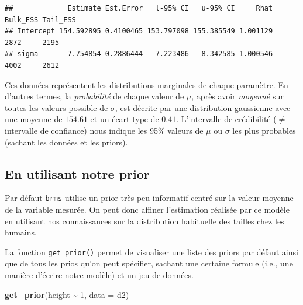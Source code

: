 \documentclass[
  a4paper,11pt,twoside,onecolumn,openright,final,oldfontcommands]{memoir}
\newenvironment{Shaded}{\begin{snugshade}}{\end{snugshade}}
\newcommand{\DataTypeTok}[1]{\textcolor[rgb]{0.13,0.29,0.53}{#1}}
\newcommand{\DecValTok}[1]{\textcolor[rgb]{0.00,0.00,0.81}{#1}}
\newcommand{\KeywordTok}[1]{\textcolor[rgb]{0.13,0.29,0.53}{\textbf{#1}}}
\newcommand{\NormalTok}[1]{#1}
\newcommand{\OperatorTok}[1]{\textcolor[rgb]{0.81,0.36,0.00}{\textbf{#1}}}
\newcommand{\StringTok}[1]{\textcolor[rgb]{0.31,0.60,0.02}{#1}}
\theoremstyle{definition}
\theoremstyle{definition}
\theoremstyle{definition}
\theoremstyle{remark}
\begin{document}
\begin{Shaded}
\end{Shaded}

\begin{verbatim}
##             Estimate Est.Error   l-95% CI   u-95% CI     Rhat Bulk_ESS Tail_ESS
## Intercept 154.592895 0.4100465 153.797098 155.385549 1.001129     2872     2195
## sigma       7.754854 0.2886444   7.223486   8.342585 1.000546     4002     2612
\end{verbatim}

Ces données représentent les distributions marginales de chaque paramètre. En d'autres termes, la \emph{probabilité} de chaque valeur de \(\mu\), après avoir \emph{moyenné} sur toutes les valeurs possible de \(\sigma\), est décrite par une distribution gaussienne avec une moyenne de \(154.61\) et un écart type de \(0.41\). L'intervalle de crédibilité (\(\neq\) intervalle de confiance) nous indique les 95\% valeurs de \(\mu\) ou \(\sigma\) les plus probables (sachant les données et les priors).

\hypertarget{en-utilisant-notre-prior}{%
\subsection{En utilisant notre prior}\label{en-utilisant-notre-prior}}

Par défaut \texttt{brms} utilise un prior très peu informatif centré sur la valeur moyenne de la variable mesurée. On peut donc affiner l'estimation réalisée par ce modèle en utilisant nos connaissances sur la distribution habituelle des tailles chez les humains.

La fonction \texttt{get\_prior()} permet de visualiser une liste des priors par défaut ainsi que de tous les prios qu'on peut spécifier, sachant une certaine formule (i.e., une manière d'écrire notre modèle) et un jeu de données.

\begin{Shaded}
\begin{Highlighting}[]
\KeywordTok{get\_prior}\NormalTok{(height }\OperatorTok{\textasciitilde{}}\StringTok{ }\DecValTok{1}\NormalTok{, }\DataTypeTok{data =}\NormalTok{ d2)}
\end{Highlighting}
\end{Shaded}
\end{document}
